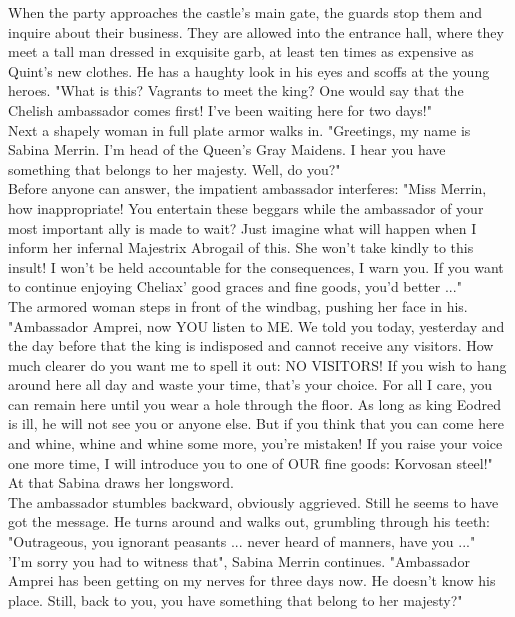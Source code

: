 When the party approaches the castle's main gate, the guards stop them and inquire about their business. They are allowed into the entrance hall, where they meet a tall man dressed in exquisite garb, at least ten times as expensive as Quint's new clothes. He has a haughty look in his eyes and scoffs at the young heroes. "What is this? Vagrants to meet the king? One would say that the Chelish ambassador comes first! I've been waiting here for two days!"\\

Next a shapely woman in full plate armor walks in. "Greetings, my name is Sabina Merrin. I'm head of the Queen's Gray Maidens. I hear you have something that belongs to her majesty. Well, do you?"\\

Before anyone can answer, the impatient ambassador interferes: "Miss Merrin, how inappropriate! You entertain these beggars while the ambassador of your most important ally is made to wait? Just imagine what will happen when I inform her infernal Majestrix Abrogail of this. She won't take kindly to this insult! I won't be held accountable for the consequences, I warn you. If you want to continue enjoying Cheliax' good graces and fine goods, you'd better ..."\\

The armored woman steps in front of the windbag, pushing her face in his. "Ambassador Amprei, now YOU listen to ME. We told you today, yesterday and the day before that the king is indisposed and cannot receive any visitors. How much clearer do you want me to spell it out: NO VISITORS! If you wish to hang around here all day and waste your time, that's your choice. For all I care, you can remain here until you wear a hole through the floor. As long as king Eodred is ill, he will not see you or anyone else. But if you think that you can come here and whine, whine and whine some more, you're mistaken! If you raise your voice one more time, I will introduce you to one of OUR fine goods: Korvosan steel!" At that Sabina draws her longsword.\\

The ambassador stumbles backward, obviously aggrieved. Still he seems to have got the message. He turns around and walks out, grumbling through his teeth: "Outrageous, you ignorant peasants ... never heard of manners, have you ..."\\

'I'm sorry you had to witness that", Sabina Merrin continues. "Ambassador Amprei has been getting on my nerves for three days now. He doesn't know his place. Still, back to you, you have something that belong to her majesty?"\\

